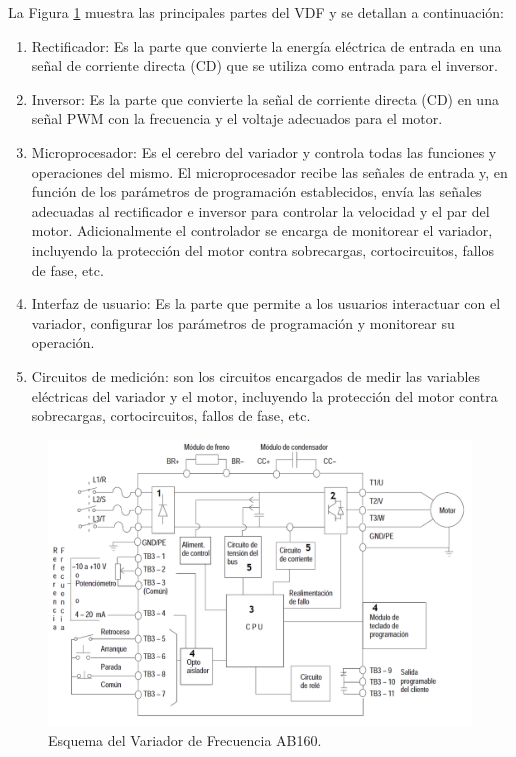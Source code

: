La Figura \ref{fig:ab160} muestra las principales partes del VDF y se detallan a continuación:
\begin{enumerate}
	\item Rectificador: Es la parte que convierte la energía eléctrica de entrada en una señal de corriente directa (CD) que se utiliza como entrada para el inversor.
	
	\item Inversor: Es la parte que convierte la señal de corriente directa (CD) en una señal PWM con la frecuencia y el voltaje adecuados para el motor.
	
	\item Microprocesador: Es el cerebro del variador y controla todas las funciones y operaciones del mismo. El microprocesador recibe las señales de entrada y, en función de los parámetros de programación establecidos, envía las señales adecuadas al rectificador e inversor para controlar la velocidad y el par del motor.
	Adicionalmente el controlador se encarga de monitorear el variador, incluyendo la protección del motor contra sobrecargas, cortocircuitos, fallos de fase, etc.
	
	\item Interfaz de usuario: Es la parte que permite a los usuarios interactuar con el variador, configurar los parámetros de programación y monitorear su operación.
	
	\item Circuitos de medición: son los circuitos encargados de medir las variables eléctricas del variador y el motor, incluyendo la protección del motor contra sobrecargas, cortocircuitos, fallos de fase, etc.
	
\end{enumerate}

\begin{figure}
	\centering
	\includegraphics[width=0.9\linewidth]{Imagenes/AB160}
	\caption{Esquema del Variador de Frecuencia AB160.\cite{AB160} }
	\label{fig:ab160}
\end{figure}

